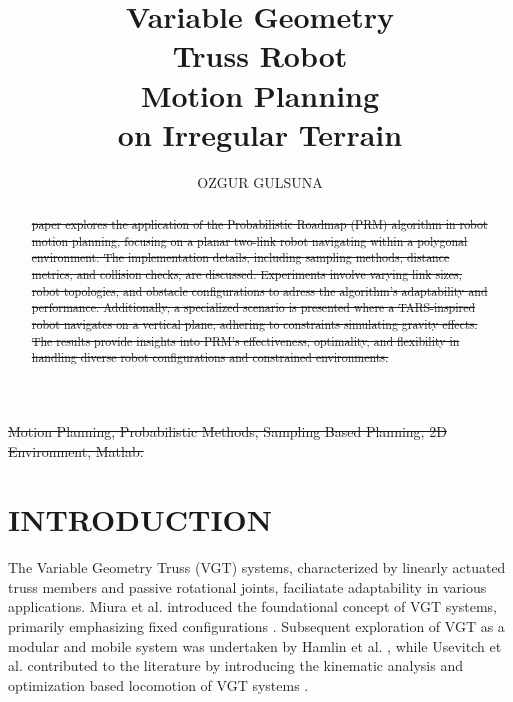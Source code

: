 \documentclass{IEEEtaes}
\begin{document}
\title{{\fontsize{22}{10}\selectfont \textbf{Variable Geometry}} \\ 
       {\fontsize{33.4}{10} \textbf{Truss Robot}} \\
       {\fontsize{24.9}{10} \textbf{Motion Planning} }\\
       on Irregular Terrain}


\author{OZGUR GULSUNA}
\member{}



\editor{}
\supplementary{}




\maketitle

\begin{abstract}\st{ paper explores the application of the Probabilistic Roadmap (PRM) algorithm in robot motion planning, focusing on a planar two-link robot navigating within a polygonal environment. The implementation details, including sampling methods, distance metrics, and collision checks, are discussed. Experiments involve varying link sizes, robot topologies, and obstacle configurations to adress the algorithm's adaptability and performance. Additionally, a specialized scenario is presented where a TARS-inspired robot navigates on a vertical plane, adhering to constraints simulating gravity effects. The results provide insights into PRM's effectiveness, optimality, and flexibility in handling diverse robot configurations and constrained environments.}
\end{abstract}

\begin{IEEEkeywords}\st{Motion Planning, Probabilistic Methods, Sampling Based Planning, 2D Environment, Matlab.}
\end{IEEEkeywords}
\vfill\null


\section{\normalsize INTRODUCTION}

{\scshape T}he Variable Geometry Truss (VGT) systems, characterized by linearly actuated truss members and passive rotational joints, faciliatate adaptability in various applications. Miura et al. introduced the foundational concept of VGT systems, primarily emphasizing fixed configurations \cite{miura}. Subsequent exploration of VGT as a modular and mobile system was undertaken by Hamlin et al. \cite{hamlin}, while Usevitch et al. contributed to the literature by introducing the kinematic analysis and optimization based locomotion of VGT systems \cite{usevitch}.
\end{document}
